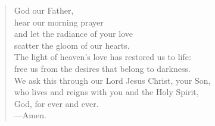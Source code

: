 \prayer

\setlength{\vleftmargin}{\prayerleftmargini}

\begin{verse}
God our Father,\\
hear our morning prayer\\
and let the radiance of your love\\
scatter the gloom of our hearts.\\
The light of heaven’s love has restored us to life:\\
free us from the desires that belong to darkness.\\
We ask this through our Lord Jesus Christ, your Son,\\
who lives and reigns with you and the Holy Spirit,\\
God, for ever and ever.\\
{\color{red}---\thinspace}Amen.
\end{verse}

\setlength{\vleftmargin}{\defleftmargini}